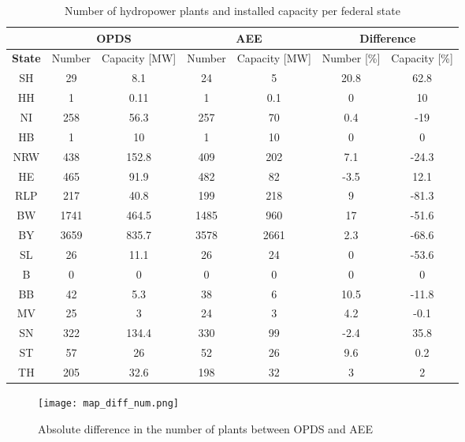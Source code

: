 \begin{table}[H]
\footnotesize 
 \centering
 \caption[Number of hydropower plants and installed capacity per federal state]{Number of hydropower plants and installed capacity per federal state}
 \label{oedb_aee_diff}
 \begin{tabular}{|c|cc|cc| cc|}
  \cline{2-7}
  \multicolumn{0}{c|}{} &\multicolumn{2}{c}{\textbf{OPDS \cite{oedb}}}&\multicolumn{2}{|c|}{\textbf{AEE \cite{aee}}}&\multicolumn{2}{c|}{\textbf{Difference}} \\
  \hline
  \textbf{State} & Number 	& 	Capacity [\unit{MW}] 	&	Number 	& 	Capacity [\unit{MW}] 	&	Number [\unit{\%}] 	&	Capacity [\unit{\%}] \\
  \hline
  SH	&	29	&	8.1		&	24	&	5		&	20.8		&	62.8	\\
  HH	&	1	&	0.11		&	1	&	0.1		&	0		&	10	\\
  NI	&	258	&	56.3		&	257	&	70		&	0.4		&	-19	\\
  HB	&	1	&	10		&	1	&	10		&	0		&	0	\\
  NRW	&	438	&	152.8		&	409	&	202		&	7.1		&	-24.3	\\
  HE	&	465	&	91.9		&	482	&	82		&	-3.5		&	12.1	\\
  RLP	&	217	&	40.8		&	199	&	218		&	9		&	-81.3	\\
  BW	&	1741	&	464.5		&	1485	&	960		&	17		&	-51.6	\\	
  BY	&	3659	&	835.7		&	3578	&	2661		&	2.3		&	-68.6	\\
  SL	&	26	&	11.1		&	26	&	24		&	0		&	-53.6	\\
  B	&	0	&	0		&	0	&	0		&	0		&	0	\\
  BB	&	42	&	5.3		&	38	&	6		&	10.5		&	-11.8	\\
  MV	&	25	&	3		&	24	&	3		&	4.2		&	-0.1	\\
  SN	&	322	&	134.4		&	330	&	99		&	-2.4		&	35.8	\\
  ST	&	57	&	26		&	52	&	26		&	9.6		&	0.2	\\
  TH	&	205	&	32.6		&	198	&	32		&	3		&	2	\\
  \hline
 \end{tabular} 
\end{table}


\begin{figure}[H]
\centering
\texttt{[image: map\_diff\_num.png]}
\caption[Absolute difference in the number of plants between OPDS and AEE]{Absolute difference in the number of plants between OPDS and AEE}
\label{map_diff_num}
\end{figure}


